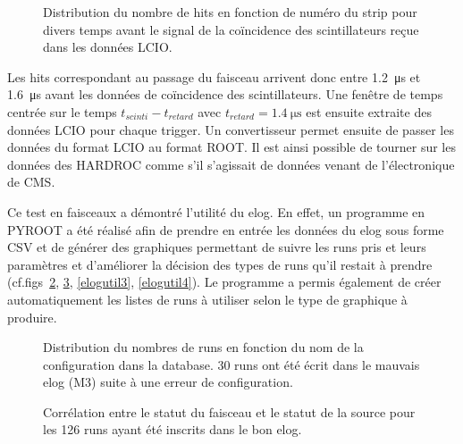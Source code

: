 \begin{figure}[ht!]
	\hfill
	\caption{Distribution du nombre de hits en fonction de numéro du strip pour divers temps avant le signal de la coïncidence des scintillateurs reçue dans les données LCIO.}
	\label{decalage}
\end{figure}  

Les hits correspondant au passage du faisceau arrivent donc entre  \SI{1.2}{\micro\second} et \SI{1.6}{\micro\second} avant les données de coïncidence des scintillateurs. Une fenêtre de temps centrée sur le temps $t_{scinti}-t_{retard}$ avec $t_{retard}=\SI{1.4}{\micro\second}$ est ensuite extraite des données LCIO pour chaque trigger. Un convertisseur permet ensuite de passer les données du format LCIO au format ROOT. Il est ainsi possible de tourner sur les données des HARDROC comme s'il s'agissait de données venant de l'électronique de CMS.

Ce test en faisceaux a démontré l'utilité du elog. En effet, un programme en PYROOT a été réalisé afin de prendre en entrée les données du elog sous forme CSV et de générer des graphiques permettant de suivre les runs pris et leurs paramètres et d'améliorer la décision des types de runs qu'il restait à prendre (cf.figs~\ref{elogutil1}, \ref{elogutil2}, \ref{elogutil3}, \ref{elogutil4}). Le programme a permis également de créer automatiquement les listes de runs à utiliser selon le type de graphique à produire. 

\begin{figure}[ht!]
	\centering
	\caption{Distribution du nombres de runs en fonction du nom de la configuration dans la database. \num{30} runs ont été écrit dans le mauvais elog (M3) suite à une erreur de configuration.}
	\label{elogutil1}	
\end{figure}

\begin{figure}[ht!]
	\centering
	\caption{Corrélation entre le statut du faisceau et le statut de la source pour les \num{126} runs ayant été inscrits dans le bon elog.}
	\label{elogutil2}	
\end{figure}

